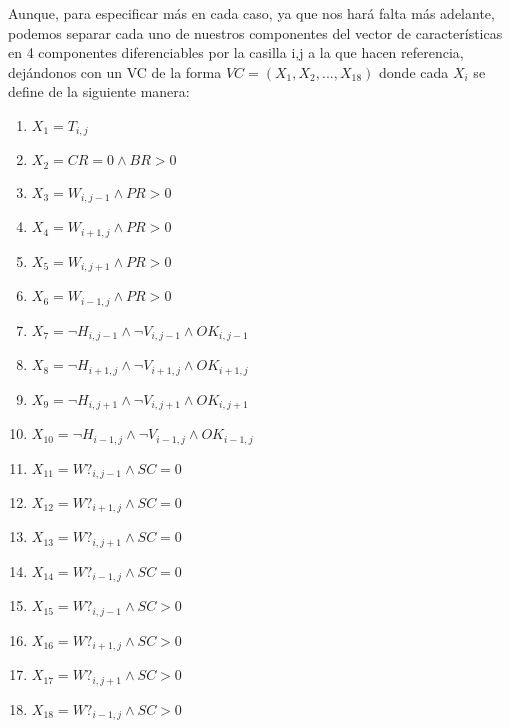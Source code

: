 Aunque, para especificar más en cada caso, ya que nos hará falta más adelante, podemos separar cada uno de nuestros componentes del vector de características en 4 componentes diferenciables por la casilla i,j a la que hacen referencia, dejándonos con un VC de la forma $ VC = (X_1, X_2, ..., X_{18}) $ donde cada $X_i$ se define de la siguiente manera:
\begin{enumerate}
    \item $X_1 = T_{i,j}$
    \item $X_2 = CR = 0 \wedge BR > 0$
    \item $X_3 = W_{i,j-1} \wedge PR > 0$
    \item $X_4 = W_{i+1,j} \wedge PR > 0$
    \item $X_5 = W_{i,j+1} \wedge PR > 0$
    \item $X_6 = W_{i-1,j} \wedge PR > 0$
    \item $X_7 = \neg H_{i,j-1} \wedge \neg V_{i,j-1} \wedge OK_{i,j-1}$
    \item $X_{8} = \neg H_{i+1,j} \wedge \neg V_{i+1,j} \wedge OK_{i+1,j}$
    \item $X_{9} = \neg H_{i,j+1} \wedge \neg V_{i,j+1} \wedge OK_{i,j+1}$
    \item $X_{10} = \neg H_{i-1,j} \wedge \neg V_{i-1,j} \wedge OK_{i-1,j}$
    \item $X_{11} = W?_{i,j-1} \wedge SC = 0$
    \item $X_{12} = W?_{i+1,j} \wedge SC = 0$
    \item $X_{13} = W?_{i,j+1} \wedge SC = 0$
    \item $X_{14} = W?_{i-1,j} \wedge SC = 0$
    \item $X_{15} = W?_{i,j-1} \wedge SC > 0$
    \item $X_{16} = W?_{i+1,j} \wedge SC > 0$
    \item $X_{17} = W?_{i,j+1} \wedge SC > 0$
    \item $X_{18} = W?_{i-1,j} \wedge SC > 0$
\end{enumerate}{}